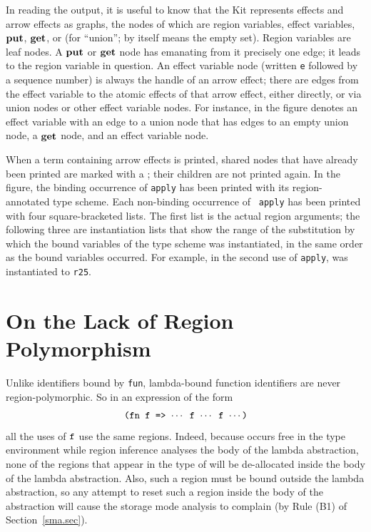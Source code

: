\documentclass[12pt]{book}
\begin{document}
In reading the output, it is useful to know that the Kit represents
effects and arrow effects as graphs, the nodes of which are region
variables, effect variables, $\mathop{\bf put}\nolimits$, $\mathop{\bf get}\nolimits$, or  (for
``union'';  by itself means the empty set).  Region variables
are leaf nodes. A $\mathop{\bf put}\nolimits$ or $\mathop{\bf get}\nolimits$ node has emanating from it
precisely one edge; it leads to the region variable in question.  An
effect variable node (written {\tt e} followed by a sequence number)
is always the handle of an arrow effect; there are edges from the
effect variable to the atomic effects of that arrow effect, either
directly, or via union nodes or other effect variable nodes.  For
instance,  in the figure denotes an
effect variable with an edge to a union node that has edges to an
empty union node, a $\mathop{\bf get}\nolimits$ node, and an effect variable node.

When a term containing arrow effects is printed, shared nodes that
have already been printed are marked with a ; their children
are not printed again. 
In the figure, the binding occurrence of {\tt apply} has been printed
with its region-annotated type scheme. Each non-binding occurrence of {\tt
  apply} has been printed with four square-bracketed lists. The first
list is the actual region arguments; the following three are
instantiation lists that show the range of the substitution by
which the bound variables of the type scheme was instantiated, in the
same order as the bound variables occurred.  For example, in the
second use of {\tt apply},  was instantiated to {\tt r25}.

\section{On the Lack of Region Polymorphism}
Unlike identifiers bound by {\tt fun}, lambda-bound function
identifiers are never region-polymorphic. So in an expression of the
form
$$\hbox{\tt (fn f => $\cdots$ f $\cdots$ f $\cdots$)}$$
all the uses of
$\hbox{\tt f}$ use the same regions. Indeed, because  occurs
free in the type environment while region inference analyses the body
of the lambda abstraction, none of the regions that appear in the type
of  will be de-allocated inside the body of the lambda
abstraction. Also, such a region must be bound outside the lambda
abstraction, so any attempt to reset such a region inside the body of
the abstraction will cause the storage mode analysis to complain (by
Rule (B1) of Section~\ref{sma.sec}).
\end{document}
